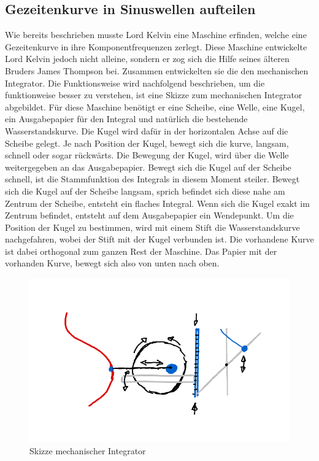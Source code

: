 \subsection{Gezeitenkurve in Sinuswellen aufteilen
	\label{gezeiten:subsection:malorum}}
Wie bereits beschrieben musste Lord Kelvin eine Maschine erfinden, welche eine Gezeitenkurve in ihre Komponentfrequenzen zerlegt.
Diese Maschine entwickelte Lord Kelvin jedoch nicht alleine, sondern er zog sich die Hilfe seines älteren Bruders James Thompson bei.
Zusammen entwickelten sie die den mechanischen Integrator.
Die Funktionsweise wird nachfolgend beschrieben, um die funktionweise besser zu verstehen, ist eine Skizze zum mechanischen Integrator abgebildet.
Für diese Maschine benötigt er eine Scheibe, eine Welle, eine Kugel, ein Ausgabepapier für den Integral und natürlich die bestehende Wasserstandskurve.
Die Kugel wird dafür in der horizontalen Achse auf die Scheibe gelegt.
Je nach Position der Kugel, bewegt sich die kurve, langsam, schnell oder sogar rückwärts.
Die Bewegung der Kugel, wird über die Welle weitergegeben an das Ausgabepapier.
Bewegt sich die Kugel auf der Scheibe schnell, ist die Stammfunktion des Integrals in diesem Moment steiler.
Bewegt sich die Kugel auf der Scheibe langsam, sprich befindet sich diese nahe am Zentrum der Scheibe, entsteht ein flaches Integral.
Wenn sich die Kugel exakt im Zentrum befindet, entsteht auf dem Ausgabepapier ein Wendepunkt.
Um die Position der Kugel zu bestimmen, wird mit einem Stift die Wasserstandskurve nachgefahren, wobei der Stift mit der Kugel verbunden ist.
Die vorhandene Kurve ist dabei orthogonal zum ganzen Rest der Maschine.
Das Papier mit der vorhanden Kurve, bewegt sich also von unten nach oben.

\begin{figure}
	\centering
	\includegraphics[width=\linewidth]{"papers/gezeiten/Skizze Integralmaschine"}
	\caption{Skizze mechanischer Integrator}
	\label{fig:skizze-integralmaschine}
\end{figure}

